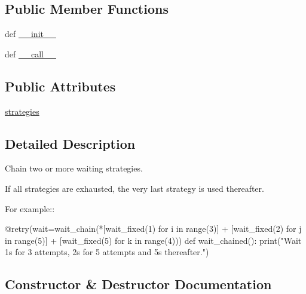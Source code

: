 \subsection*{Public Member Functions}
\begin{DoxyCompactItemize}
\item 
def \hyperlink{classpip_1_1__vendor_1_1tenacity_1_1wait_1_1wait__chain_a7041532dd5f6c87dba560ad775dce55c}{\+\_\+\+\_\+init\+\_\+\+\_\+}
\item 
def \hyperlink{classpip_1_1__vendor_1_1tenacity_1_1wait_1_1wait__chain_a9bf49356b899002ff8e60255effe88e7}{\+\_\+\+\_\+call\+\_\+\+\_\+}
\end{DoxyCompactItemize}
\subsection*{Public Attributes}
\begin{DoxyCompactItemize}
\item 
\hyperlink{classpip_1_1__vendor_1_1tenacity_1_1wait_1_1wait__chain_a1d703803145b90258e78803f6fec89f2}{strategies}
\end{DoxyCompactItemize}


\subsection{Detailed Description}
\begin{DoxyVerb}Chain two or more waiting strategies.

If all strategies are exhausted, the very last strategy is used
thereafter.

For example::

    @retry(wait=wait_chain(*[wait_fixed(1) for i in range(3)] +
                           [wait_fixed(2) for j in range(5)] +
                           [wait_fixed(5) for k in range(4)))
    def wait_chained():
        print("Wait 1s for 3 attempts, 2s for 5 attempts and 5s
               thereafter.")
\end{DoxyVerb}
 

\subsection{Constructor \& Destructor Documentation}
\mbox{\label{classpip_1_1__vendor_1_1tenacity_1_1wait_1_1wait__chain_a7041532dd5f6c87dba560ad775dce55c}} 
